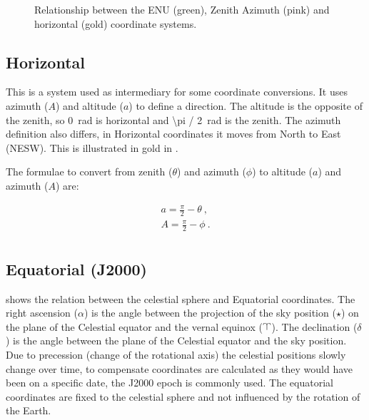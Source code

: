 \begin{figure}
    \centering
    
    \caption{Relationship between the ENU (green), Zenith Azimuth (pink)
             and horizontal (gold) coordinate systems.}
    \label{fig:enu_horizontal}
\end{figure}


\subsection{Horizontal}

This is a system used as intermediary for some coordinate conversions.
It uses azimuth ($A$) and altitude ($a$) to define a direction. The
altitude is the opposite of the zenith, so \SI{0}{\radian} is horizontal
and \SI{\pi / 2}{\radian} is the zenith. The azimuth definition also
differs, in Horizontal coordinates it moves from North to East (NESW).
This is illustrated in gold in .

The formulae to convert from zenith ($\theta$) and azimuth ($\phi$) to
altitude ($a$) and azimuth ($A$) are:

\begin{equation}
    \begin{array}{l}
        a = \frac{\pi}{2} - \theta \ , \\
        A = \frac{\pi}{2} - \phi \ . \\
    \end{array}
\end{equation}


\subsection{Equatorial (J2000)}

 shows the relation between the celestial sphere
and Equatorial coordinates. The right ascension ($\alpha$) is the angle
between the projection of the sky position ($\star$) on the plane of the
Celestial equator and the vernal equinox ($\vernal$). The declination
($\delta$) is the angle between the plane of the Celestial equator and
the sky position. Due to precession (change of the rotational axis) the
celestial positions slowly change over time, to compensate coordinates
are calculated as they would have been on a specific date, the J2000
epoch is commonly used. The equatorial coordinates are fixed to the
celestial sphere and not influenced by the rotation of the Earth.

